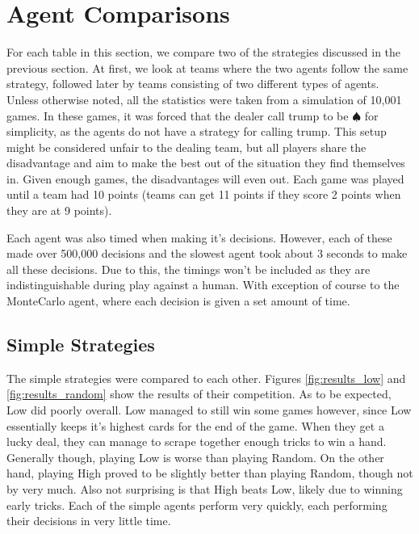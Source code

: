
\section{Agent Comparisons}

For each table in this section, we compare two of the strategies discussed in the previous section. At first, we look at
teams where the two agents follow the same strategy, followed later by teams consisting of two different types of agents.
Unless otherwise noted, all the statistics were taken from a simulation of 10,001 games. In these games, it was forced
that the dealer call trump to be $\spadesuit$ for simplicity, as the agents do not have a strategy for calling trump.
This setup might be considered unfair to the dealing team, but all players share the disadvantage and aim to make the best
out of the situation they find themselves in. Given enough games, the disadvantages will even out.
Each game was played until a team had 10 points (teams can get 11 points if they score 2 points when they are at 9 points).

Each agent was also timed when making it's decisions. However, each of these made over 500,000 decisions and the slowest
agent took about 3 seconds to make all these decisions. Due to this, the timings won't be included as they are indistinguishable
during play against a human. With exception of course to the MonteCarlo agent, where each decision is given a set amount of time.


\subsection{Simple Strategies}

The simple strategies were compared to each other. Figures \ref{fig:results_low} and \ref{fig:results_random} show the results of their competition.
As to be expected, Low did poorly overall. Low managed to still win some games however, since Low essentially keeps it's highest cards for the
end of the game. When they get a lucky deal, they can manage to scrape together enough tricks to win a hand. Generally though, playing Low is
worse than playing Random. On the other hand, playing High proved to be slightly better than playing Random, though not by very much.
Also not surprising is that High beats Low, likely due to winning early tricks. Each of the simple agents perform very quickly, each performing
their decisions in very little time.

